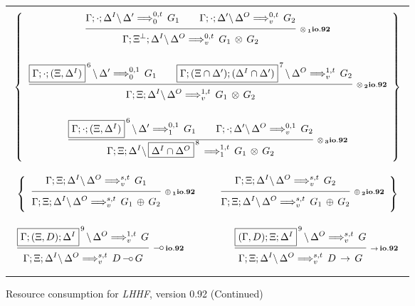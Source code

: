 \clearpage
\begin{figure}[t]
  \begin{center}
    \leavevmode

    \begin{tabular}{|c|}
      \hline \\
      $\left\{
        \begin{array}{c}
          \ruleII
            {\ioIXc{\G;\cdot;\D^I}{\D'}{G_1}{0}{0,t}}
            {\ioIXc{\G;\cdot;\D'}{\D^O}{G_2}{v}{0,t}}
            {\ioIXc{\G;\X^\bot;\D^I}{\D^O}{G_1 \Times G_2}{v}{0,t}}
            {\Times_1 io.92}
        \\ \\
          \ruleII
            {\ioIXc{\fb{\G;\cdot;(\X,\D^I)}{6}}{\D'}{G_1}{0}{0,1}}
            {\ioIXc
              {\fb{\G;(\X \cap \D');(\D^I \cap \D')}{7}}
              {\D^O}
              {G_2}{v}{1,t}}
            {\ioIXc{\G;\X;\D^I}{\D^O}{G_1 \Times G_2}{v}{1,t}}
            {\Times_2 io.92}
        \\ \\
          \ruleII
            {\ioIXc{\fb{\G;\cdot;(\X,\D^I)}{6}}{\D'}{G_1}{1}{0,1}}
            {\ioIXc{\G;\cdot;\D'}{\D^O}{G_2}{v}{0,1}}
            {\ioIXc
              {\G;\X;\D^I}
              {\fb{\D^I \cap \D^O}{8}}
              {G_1 \Times G_2}{1}{1,t}}
            {\Times_3 io.92}
        \end{array}
      \right\}$

      \\ \\ \\
      $\left\{
        \begin{array}{ccc}
          \ruleI
            {\ioIXc{\G;\X;\D^I}{\D^O}{G_1}{v}{s,t}}
            {\ioIXc{\G;\X;\D^I}{\D^O}{G_1 \Plus G_2}{v}{s,t}}
            {\Plus_1 io.92}
        &
          \hspace{0.5em}
        &
          \ruleI
            {\ioIXc{\G;\X;\D^I}{\D^O}{G_2}{v}{s,t}}
            {\ioIXc{\G;\X;\D^I}{\D^O}{G_1 \Plus G_2}{v}{s,t}}
            {\Plus_2 io.92}
        \end{array}
      \right\}$

      \\ \\ \\
      $\begin{array}{ccc}
        \ruleI
          {\ioIXc{\fb{\G;(\X,D);\D^I}{9}}{\D^O}{G}{v}{1,t}}
          {\ioIXc{\G;\X;\D^I}{\D^O}{D \Lolli G}{v}{s,t}}
          {\Lolli io.92}
      &
        \hspace{3em}
      &
        \ruleI
          {\ioIXc{\fb{(\G,D);\X;\D^I}{9}}{\D^O}{G}{v}{s,t}}
          {\ioIXc{\G;\X;\D^I}{\D^O}{D \Imp G}{v}{s,t}}
          {\Imp io.92}
      \end{array}$
      \\ \\
      \hline
    \end{tabular}

    \caption{Resource consumption for {\em LHHF}, version 0.92 (Continued)}
    \label{fig:RC_IXc2}
  \end{center}
\end{figure}

